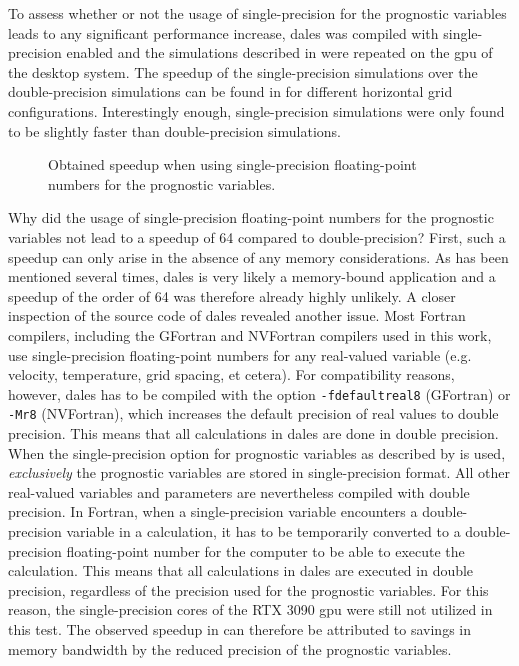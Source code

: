 To assess whether or not the usage of single-precision for the prognostic variables leads to any significant performance increase, \acrshort{dales} was compiled with single-precision enabled and the simulations described in  were repeated on the \acrshort{gpu} of the desktop system. The speedup of the single-precision simulations over the double-precision simulations can be found in  for different horizontal grid configurations. Interestingly enough, single-precision simulations were only found to be slightly faster than double-precision simulations.

\begin{figure}[h!]
    \centering
    
    \caption{Obtained speedup when using single-precision floating-point numbers for the prognostic variables.}
    \label{fig:single_vs_double_precision}
\end{figure}

Why did the usage of single-precision floating-point numbers for the prognostic variables not lead to a speedup of 64 compared to double-precision? First, such a speedup can only arise in the absence of any memory considerations. As has been mentioned several times, \acrshort{dales} is very likely a memory-bound application and a speedup of the order of 64 was therefore already highly unlikely. A closer inspection of the source code of \acrshort{dales} revealed another issue. Most Fortran compilers, including the GFortran and NVFortran compilers used in this work, use single-precision floating-point numbers for any real-valued variable (e.g. velocity, temperature, grid spacing, et cetera). For compatibility reasons, however, \acrshort{dales} has to be compiled with the option \texttt{-fdefaultreal8} (GFortran) or \texttt{-Mr8} (NVFortran), which increases the default precision of real values to double precision. This means that all calculations in \acrshort{dales} are done in double precision. When the single-precision option for prognostic variables as described by \citet{janssonCloudBotanyShallow2023} is used, \emph{exclusively} the prognostic variables are stored in single-precision format. All other real-valued variables and parameters are nevertheless compiled with double precision. In Fortran, when a single-precision variable encounters a double-precision variable in a calculation, it has to be temporarily converted to a double-precision floating-point number for the computer to be able to execute the calculation. This means that all calculations in \acrshort{dales} are executed in double precision, regardless of the precision used for the prognostic variables. For this reason, the single-precision cores of the RTX 3090 \acrshort{gpu} were still not utilized in this test. The observed speedup in  can therefore be attributed to savings in memory bandwidth by the reduced precision of the prognostic variables.
